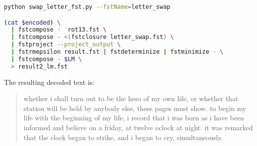 \documentclass[a4paper,oneside,reqno]{amsart}
\begin{document}
\begin{enumerate}[label=\arabic*.]
\begin{enumerate}[label=(\alph*)]
\begin{lstlisting}[language=bash]
python swap_letter_fst.py --fstName=letter_swap

(cat $encoded) \
  | fstcompose -  rot13.fst \
  | fstcompose - <(fstclosure letter_swap.fst) \
  | fstproject --project_output \
  | fstrmepsilon result.fst | fstdeterminize | fstminimize - \
  | fstcompose - $LM \
  > result2_lm.fst
    \end{lstlisting}
    The resulting decoded text is:
    \begin{quote} %
      whether i shall turn out to be the hero of my own life, or whether that station
      will be held by anybody else, these pages must show. to begin my life
      with the beginning of my life, i record that i was born as i have been
      informed and believe on a friday, at twelve oclock at night. it was
      remarked that the clock began to strike, and i began to cry,
      simultaneously.
    \end{quote}
  \end{enumerate}
\end{enumerate}

%
%


\end{document}
